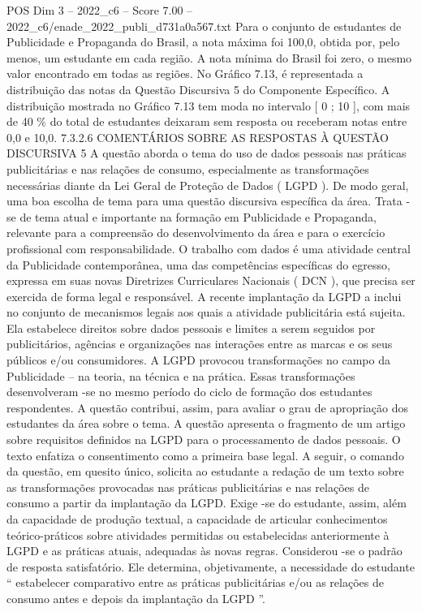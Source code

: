 \begin{textsample}{POS Dim 3 – 2022\_c6 – Score 7.00 – 2022\_c6/enade\_2022\_publi\_d731a0a567.txt}
Para o conjunto de estudantes de Publicidade e Propaganda do Brasil, a nota máxima foi 100,0, obtida por, pelo menos, um estudante em cada região.
A nota mínima do Brasil foi zero, o mesmo valor encontrado em todas as regiões.
No Gráfico 7.13, é representada a distribuição das notas da Questão Discursiva 5 do Componente Específico.
A distribuição mostrada no Gráfico 7.13 tem moda no intervalo [ 0 ; 10 ], com mais de 40 \% do total de estudantes deixaram sem resposta ou receberam notas entre 0,0 e 10,0. 7.3.2.6 COMENTÁRIOS SOBRE AS RESPOSTAS À QUESTÃO DISCURSIVA 5 A questão aborda o tema do uso de dados pessoais nas práticas publicitárias e nas relações de consumo, especialmente as transformações necessárias diante da Lei Geral de Proteção de Dados ( LGPD ).
De modo geral, uma boa escolha de tema para uma questão discursiva específica da área.
Trata -se de tema atual e importante na formação em Publicidade e Propaganda, relevante para a compreensão do desenvolvimento da área e para o exercício profissional com responsabilidade.
O trabalho com dados é uma atividade central da Publicidade contemporânea, uma das competências específicas do egresso, expressa em suas novas Diretrizes Curriculares Nacionais ( DCN ), que precisa ser exercida de forma legal e responsável.
A recente implantação da LGPD a inclui no conjunto de mecanismos legais aos quais a atividade publicitária está sujeita.
Ela estabelece direitos sobre dados pessoais e limites a serem seguidos por publicitários, agências e organizações nas interações entre as marcas e os seus públicos e/ou consumidores.
A LGPD provocou transformações no campo da Publicidade – na teoria, na técnica e na prática.
Essas transformações desenvolveram -se no mesmo período do ciclo de formação dos estudantes respondentes.
A questão contribui, assim, para avaliar o grau de apropriação dos estudantes da área sobre o tema.
A questão apresenta o fragmento de um artigo sobre requisitos definidos na LGPD para o processamento de dados pessoais.
O texto enfatiza o consentimento como a primeira base legal.
A seguir, o comando da questão, em quesito único, solicita ao estudante a redação de um texto sobre as transformações provocadas nas práticas publicitárias e nas relações de consumo a partir da implantação da LGPD.
Exige -se do estudante, assim, além da capacidade de produção textual, a capacidade de articular conhecimentos teórico-práticos sobre atividades permitidas ou estabelecidas anteriormente à LGPD e as práticas atuais, adequadas às novas regras.
Considerou -se o padrão de resposta satisfatório.
Ele determina, objetivamente, a necessidade do estudante “ estabelecer comparativo entre as práticas publicitárias e/ou as relações de consumo antes e depois da implantação da LGPD ”.

\end{textsample}
